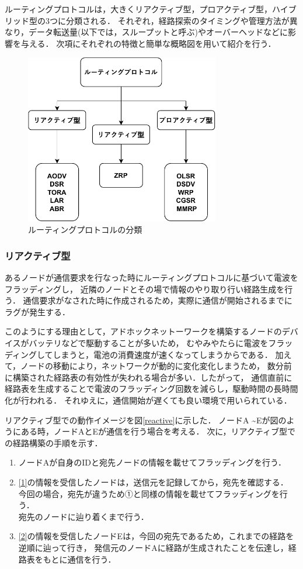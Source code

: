 \documentclass[a4paper, 11pt]{ltjsarticle}
\begin{document}
ルーティングプロトコルは，大きくリアクティブ型，プロアクティブ型，ハイブリッド型の3つに分類される．
それぞれ，経路探索のタイミングや管理方法が異なり，データ転送量(以下では，スループットと呼ぶ)やオーバーヘッドなどに影響を与える．
次項にそれぞれの特徴と簡単な概略図を用いて紹介を行う．
\begin{figure}[H]
  \centering
  \includegraphics[width=85mm]{classification_of_routing.pdf}
  \caption{ルーティングプロトコルの分類}
  \label{routing_classification}
\end{figure}

\clearpage
\subsubsection{リアクティブ型}
あるノードが通信要求を行なった時にルーティングプロトコルに基づいて電波をフラッディングし，
近隣のノードとその場で情報のやり取り行い経路生成を行う．
通信要求がなされた時に作成されるため，実際に通信が開始されるまでにラグが発生する．

このようにする理由として，アドホックネットーワークを構築するノードのデバイスがバッテリなどで駆動することが多いため，
むやみやたらに電波をフラッディングしてしまうと，電池の消費速度が速くなってしまうからである．
加えて，ノードの移動により，ネットワークが動的に変化変化しまうため，
数分前に構築された経路表の有効性が失われる場合が多い．したがって，
通信直前に経路表を生成することで電波のフラッディング回数を減らし，駆動時間の長時間化が行われる．
それゆえに，通信開始が遅くても良い環境で用いられている．

リアクティブ型での動作イメージを図\ref{reactive}に示した．
ノードA \textasciitilde Eが図のようにある時，ノードAとEが通信を行う場合を考える．
次に，リアクティブ型での経路構築の手順を示す．

\begin{enumerate}[label=\ding{\numexpr171+\arabic*}]
  \item \label{1} ノードAが自身のIDと宛先ノードの情報を載せてフラッディングを行う．
  \item \label{2} \ref{1}の情報を受信したノードは，送信元を記録してから，宛先を確認する．
  今回の場合，宛先が違うため①と同様の情報を載せてフラッディングを行う．\\
  宛先のノードに辿り着くまで行う．
  \item \label{3} \ref{2}の情報を受信したノードEは，今回の宛先であるため，これまでの経路を逆順に辿って行き，
  発信元のノードAに経路が生成されたことを伝達し，経路表をもとに通信を行う．
\end{enumerate}
\end{document}
